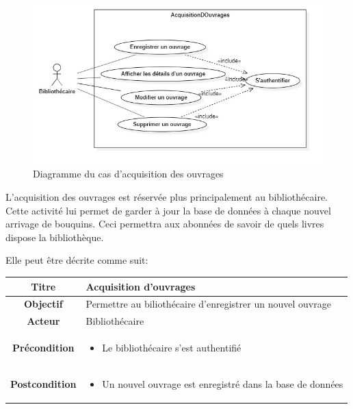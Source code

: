 \paragraph{} 
\begin{figure}[h]
        \centering
        \includegraphics[width=1\textwidth]{acquisitionDesOuvragesUseCase}
        \caption{Diagramme du cas d'acquisition des ouvrages}
        \label{image-acquisitionDesOuvragesUseCase}
        \end{figure}
\par
L'acquisition des ouvrages est réservée plus principalement au bibliothécaire. 
Cette activité lui permet de garder à jour la base de données à chaque nouvel 
arrivage de bouquins. Ceci permettra aux abonnées de savoir de quels livres dispose
la bibliothèque.  \par 
Elle peut être décrite comme suit: \par 
\begin{tabular}{|c|p{7cm}|}
        \hline
        \textbf{Titre} & Acquisition d'ouvrages  \\
        \hline
        \textbf{Objectif} & Permettre au biliothécaire d'enregistrer un nouvel ouvrage \\
        \hline
        \textbf{Acteur} & Bibliothécaire \\
        \hline
        \textbf{Précondition} & \begin{itemize}
                \item Le bibliothécaire s'est authentifié 
        \end{itemize} \\
        \hline
        \textbf{Postcondition} & \begin{itemize}
                \item Un nouvel ouvrage est enregistré dans la base de données
        \end{itemize} \\
        \hline
\end{tabular}

